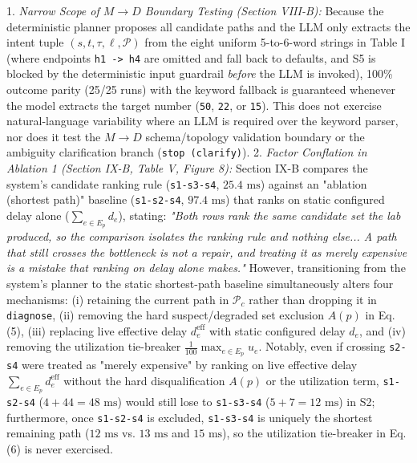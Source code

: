 \documentclass[11pt,a4paper]{article}
\begin{document}
1. \emph{Narrow Scope of $M \to D$ Boundary Testing (Section VIII-B):} Because the deterministic planner proposes all candidate paths and the LLM only extracts the intent tuple $(s, t, \tau, \ell, \mathcal{P})$ from the eight uniform 5-to-6-word strings in Table I (where endpoints \texttt{h1 -> h4} are omitted and fall back to defaults, and S5 is blocked by the deterministic input guardrail \emph{before} the LLM is invoked), 100\% outcome parity (25/25 runs) with the keyword fallback is guaranteed whenever the model extracts the target number (\texttt{50}, \texttt{22}, or \texttt{15}). This does not exercise natural-language variability where an LLM is required over the keyword parser, nor does it test the $M \to D$ schema/topology validation boundary or the ambiguity clarification branch (\texttt{stop (clarify)}).
2. \emph{Factor Conflation in Ablation 1 (Section IX-B, Table V, Figure 8):} Section IX-B compares the system's candidate ranking rule (\texttt{s1-s3-s4}, $25.4\text{ ms}$) against an "ablation (shortest path)" baseline (\texttt{s1-s2-s4}, $97.4\text{ ms}$) that ranks on static configured delay alone ($\sum_{e \in E_p} d_e$), stating: \emph{"Both rows rank the same candidate set the lab produced, so the comparison isolates the ranking rule and nothing else... A path that still crosses the bottleneck is not a repair, and treating it as merely expensive is a mistake that ranking on delay alone makes."} However, transitioning from the system's planner to the static shortest-path baseline simultaneously alters four mechanisms: (i) retaining the current path in $\mathcal{P}_c$ rather than dropping it in \texttt{diagnose}, (ii) removing the hard suspect/degraded set exclusion $A(p)$ in Eq. (5), (iii) replacing live effective delay $d_e^{\text{eff}}$ with static configured delay $d_e$, and (iv) removing the utilization tie-breaker $\frac{1}{100}\max_{e \in E_p} u_e$. Notably, even if crossing \texttt{s2-s4} were treated as "merely expensive" by ranking on live effective delay $\sum_{e \in E_p} d_e^{\text{eff}}$ without the hard disqualification $A(p)$ or the utilization term, \texttt{s1-s2-s4} ($4 + 44 = 48\text{ ms}$) would still lose to \texttt{s1-s3-s4} ($5 + 7 = 12\text{ ms}$) in S2; furthermore, once \texttt{s1-s2-s4} is excluded, \texttt{s1-s3-s4} is uniquely the shortest remaining path ($12\text{ ms}$ vs. $13\text{ ms}$ and $15\text{ ms}$), so the utilization tie-breaker in Eq. (6) is never exercised.
\end{document}
